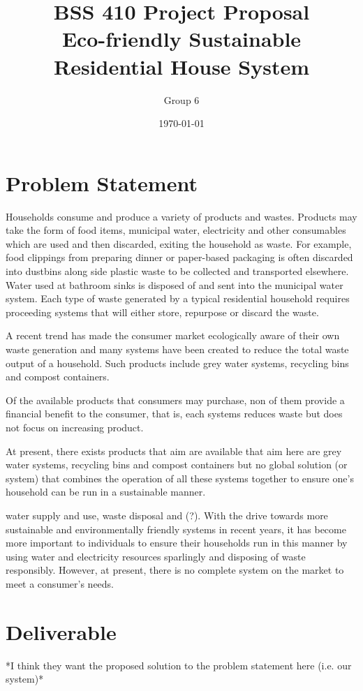 \documentclass{article}
\begin{document}
\title{\vspace{-5em} BSS 410 Project Proposal\\Eco-friendly Sustainable Residential House System}
\author{Group 6}
\date{\today}
\maketitle

\section{Problem Statement}
  Households consume and produce a variety of products and wastes. Products may take the form of food items, municipal water, electricity and other consumables which are used and then discarded, exiting the household as waste. For example, food clippings from preparing dinner or paper-based packaging is often discarded into dustbins along side plastic waste to be collected and transported elsewhere. Water used at bathroom sinks is disposed of and sent into the municipal water system. Each type of waste generated by a typical residential household requires proceeding systems that will either store, repurpose or discard the waste.
  
  A recent trend has made the consumer market ecologically aware of their own waste generation and many systems have been created to reduce the total waste output of a household. Such products include grey water systems, recycling bins and compost containers. 
  
  Of the available products that consumers may purchase, non of them provide a financial benefit to the consumer, that is, each systems reduces waste but does not focus on increasing product. 
  
  At present, there exists products that aim are available that aim here are grey water systems, recycling bins and compost containers but no global solution (or system) that combines the operation of all these systems together to ensure one's household can be run in a sustainable manner.

  
  
 water supply and use, waste disposal and (?). With the drive towards more sustainable and environmentally friendly systems in recent years, it has become more important to individuals to ensure their households run in this manner by using water and electricity resources sparlingly and disposing of waste responsibly. However, at present, there is no complete system on the market to meet a consumer's needs. 
\section{Deliverable}
*I think they want the proposed solution to the problem statement here (i.e. our system)*
\end{document}
